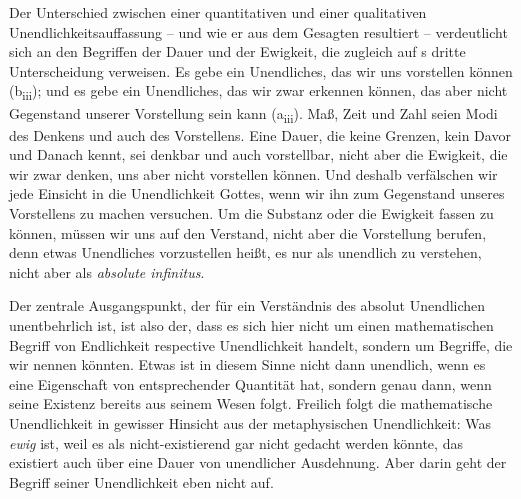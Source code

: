 Der Unterschied zwischen einer quantitativen und einer qualitativen
Unendlichkeitsauffassung -- und wie er aus dem Gesagten resultiert --
verdeutlicht sich an den Begriffen der Dauer und der Ewigkeit, die zugleich auf
s dritte Unterscheidung verweisen. Es gebe
ein Unendliches, das wir uns vorstellen können (b\textsubscript{iii}); und es gebe ein Unendliches, das
wir zwar erkennen können, das aber nicht Gegenstand unserer Vorstellung sein
kann (a\textsubscript{iii}). Maß, Zeit und Zahl seien Modi des Denkens und auch des Vorstellens.
Eine Dauer, die keine Grenzen, kein Davor und Danach kennt,  sei denkbar und
auch vorstellbar, nicht aber die Ewigkeit, die wir zwar denken, uns aber nicht
vorstellen können. Und deshalb verfälschen wir jede Einsicht in die
Unendlichkeit Gottes, wenn wir ihn zum Gegenstand unseres Vorstellens zu machen
versuchen. Um die Substanz oder die Ewigkeit fassen zu können, müssen wir uns
auf den Verstand, nicht aber die Vorstellung berufen, denn etwas Unendliches vorzustellen heißt, es
nur als  unendlich zu verstehen, nicht aber als
\emph{absolute infinitus}.

Der zentrale Ausgangspunkt, der für ein Verständnis des absolut Unendlichen
unentbehrlich ist, ist also der, dass es sich hier nicht um einen mathematischen
Begriff von Endlichkeit respective Unendlichkeit handelt, sondern um Begriffe,
die wir  nennen könnten. Etwas ist in diesem
Sinne nicht dann unendlich, wenn es eine Eigenschaft von entsprechender
Quantität hat, sondern genau dann, wenn seine Existenz bereits
aus seinem Wesen folgt. Freilich folgt die mathematische Unendlichkeit in
gewisser Hinsicht aus der metaphysischen Unendlichkeit: Was \emph{ewig} ist,
weil es als nicht-existierend gar nicht gedacht werden könnte, das existiert auch
über eine Dauer von unendlicher Ausdehnung. Aber darin geht der Begriff seiner
Unendlichkeit eben nicht auf.

